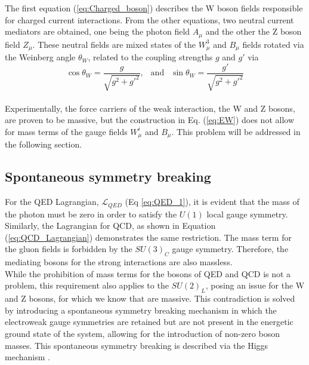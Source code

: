 The first equation (\ref{eq:Charged_boson}) describes the W boson fields responsible for charged current interactions. From the other equations, two neutral current mediators are obtained, one being the photon field $A_\mu$ and the other the Z boson field $Z_\mu$. These neutral fields are mixed states of the $W_\mu^3$ and $B_\mu$ fields rotated via the Weinberg angle $\theta_W$, related to the coupling strengths $g$ and $g'$ via
\begin{equation}
    \cos{\theta_W} = \frac{g}{\sqrt{g^2 +g'^2}}, \: \: \text{ and     } \: \: \sin{\theta_W} = \frac{g'}{\sqrt{g^2 + g'^2}}
\end{equation}\\
\indent Experimentally, the force carriers of the weak interaction, the W and Z bosons, are proven to be massive, but the construction in Eq. (\ref{eq:EW}) does not allow for mass terms of the gauge fields $W_\mu^i$ and $B_\mu$. This problem will be addressed in the following section.

\subsection{\label{sec:intro_symmetry}Spontaneous symmetry breaking}
\noindent For the QED Lagrangian, $\mathscr{L}_{QED}$ (Eq \ref{eq:QED_1}), it is evident that the mass of the photon must be zero in order to satisfy the $U(1)$ local gauge symmetry. Similarly, the Lagrangian for QCD, as shown in Equation (\ref{eq:QCD_Lagrangian}) demonstrates the same restriction. The mass term for the gluon fields is forbidden by the $SU(3)_C$ gauge symmetry. Therefore, the mediating bosons for the strong interactions are also massless.\\
\indent While the prohibition of mass terms for the bosons of QED and QCD is not a problem, this requirement also applies to the $SU(2)_L$, posing an issue for the W and Z bosons, for which we know that are massive. This contradiction is solved by introducing a spontaneous symmetry breaking mechanism in which the electroweak gauge symmetries are retained but are not present in the energetic ground state of the system, allowing for the introduction of non-zero boson masses. This spontaneous symmetry breaking is described via the Higgs mechanism \cite{HiggsMechanism1, HiggsMechanism2, HiggsMechanism3, HiggsMechanism4, HiggsMechanism5,HiggsMechanism6,HiggsMechanism7,HiggsMechanism8,HiggsMechanism9,HiggsMechanism10,HiggsMechanism11,HiggsMechanism12,HiggsMechanism13}.
